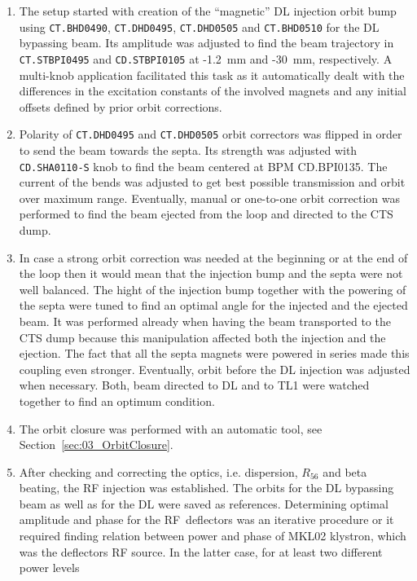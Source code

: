 \begin{enumerate}
\item
The setup started with creation of the ``magnetic'' \ac{DL} injection orbit bump using 
\texttt{CT.BHD0490}, \texttt{CT.DHD0495}, \texttt{CT.DHD0505} and \texttt{CT.BHD0510} 
for the \ac{DL} bypassing beam. Its amplitude was adjusted to find the beam trajectory
in \texttt{CT.STBPI0495} and \texttt{CD.STBPI0105} at -1.2~mm and -30~mm, respectively.
A multi-knob application facilitated this task as it automatically dealt with the differences in 
the excitation constants of the involved magnets and any initial offsets defined by
prior orbit corrections. 
\item
Polarity of \texttt{CT.DHD0495} and \texttt{CT.DHD0505} orbit correctors was flipped 
in order to send the beam towards the septa. Its strength was adjusted 
with \texttt{CD.SHA0110-S} knob to find the beam centered at BPM CD.BPI0135. 
The current of the bends was adjusted to get best possible transmission
and orbit over maximum range. Eventually, manual or one-to-one orbit correction 
was performed to find the beam ejected from the loop and directed to the CTS dump. 
\item
In case a strong orbit correction was needed at the beginning or at the end of the loop then
it would mean that the injection bump and the septa were not well balanced.
The hight of the injection bump together with the powering of the septa were tuned 
to find an optimal angle for the injected and the ejected beam.
It was performed already when having the beam transported to the CTS dump
because this manipulation affected both the injection and the ejection.
The fact that all the septa magnets were powered in series made this coupling even stronger. 
Eventually, orbit before the \ac{DL} injection was adjusted when necessary. 
Both, beam directed to \ac{DL} and to \ac{TL1} were watched together to find an optimum condition.
\item
The orbit closure was performed with an automatic tool, see Section~\ref{sec:03_OrbitClosure}.
\item
After checking and correcting the optics, i.e. dispersion, $R_{56}$ and beta beating, 
the RF injection was established.
The orbits for the \ac{DL} bypassing beam as well as for the \ac{DL} were saved as references. 
Determining optimal amplitude and phase for the RF~deflectors was an iterative procedure
or it required finding relation between power and phase of MKL02 klystron, which was the deflectors RF source. 
In the latter case, for at least two different power levels 

\end{enumerate}
